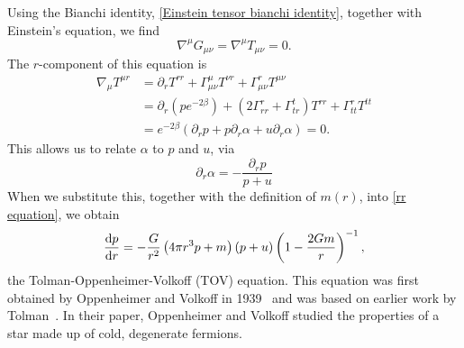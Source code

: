 Using the Bianchi identity, \autoref{Einstein tensor bianchi identity}, together with Einstein's equation, we find
%
\begin{equation}
    \nabla^\mu G_{\mu \nu} = \nabla^\mu T_{\mu \nu} = 0.
\end{equation}
%
The $r$-component of this equation is
%
\begin{align*}
    \nabla_\mu T^{\mu r} 
    & =
    \partial_r T^{rr} 
    + \Gamma^\mu_{\mu \nu} T^{\nu r} 
    + \Gamma^r_{\mu \nu} T^{\mu \nu}\\
    & = 
    \partial_r \left(p e^{-2\beta}\right)
    + (2 \Gamma^r_{rr} + \Gamma^t_{tr}) T^{rr} 
    + \Gamma^r_{tt}T^{tt} \\ 
    &=   e^{-2\beta} \left( \partial_r p + p \partial_r \alpha + u \partial_r \alpha \right) = 0.
\end{align*} 
%
This allows us to relate $\alpha$ to $p$ and $u$, via
\begin{equation}
    \partial_r \alpha = - \frac{\partial_r p}{p + u}
\end{equation}
%
When we substitute this, together with the definition of $m(r)$, into \autoref{rr equation}, we obtain
%
\begin{equation}
    \label{TOV}
    \diff{p}{r}
    =
    -
    \frac{G}{r^2} 
    \left(4 \pi r^{3} p + m \right) 
    \left(p + u\right)
    \left(1 - \frac{2 G m}{r}\right)^{-1},
\end{equation}
%
the Tolman-Oppenheimer-Volkoff (TOV) equation.
This equation was first obtained by Oppenheimer and Volkoff in 1939~\autocite{oppenheimerMassiveNeutronCores1939} and was based on earlier work by Tolman~\autocite{tolmanRelativityThermodynamicsCosmology1934}.
In their paper, Oppenheimer and Volkoff studied the properties of a star made up of cold, degenerate fermions.

